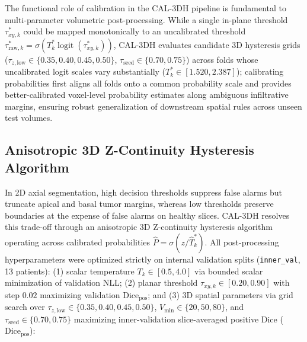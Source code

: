 \documentclass[preprint,12pt,authoryear]{elsarticle}
\begin{document}
The functional role of calibration in the CAL-3DH pipeline is fundamental to multi-parameter volumetric post-processing. While a single in-plane threshold $\tau_{xy,k}^*$ could be mapped monotonically to an uncalibrated threshold $\tau_{\text{raw},k}^* = \sigma(T_k^* \operatorname{logit}(\tau_{xy,k}^*))$, CAL-3DH evaluates candidate 3D hysteresis grids ($\tau_{z,\mathrm{low}} \in \{0.35, 0.40, 0.45, 0.50\}$, $\tau_{\mathrm{seed}} \in \{0.70, 0.75\}$) across folds whose uncalibrated logit scales vary substantially ($T_k^* \in [1.520, 2.387]$); calibrating probabilities first aligns all folds onto a common probability scale and provides better-calibrated voxel-level probability estimates along ambiguous infiltrative margins, ensuring robust generalization of downstream spatial rules across unseen test volumes.

\subsection{Anisotropic 3D Z-Continuity Hysteresis Algorithm}
In 2D axial segmentation, high decision thresholds suppress false alarms but truncate apical and basal tumor margins, whereas low thresholds preserve boundaries at the expense of false alarms on healthy slices. CAL-3DH resolves this trade-off through an anisotropic 3D Z-continuity hysteresis algorithm operating across calibrated probabilities $\hat{P} = \sigma(z / \hat{T}_k^*)$. All post-processing hyperparameters were optimized strictly on internal validation splits (\texttt{inner\_val}, 13 patients): (1) scalar temperature $T_k \in [0.5, 4.0]$ via bounded scalar minimization of validation NLL; (2) planar threshold $\tau_{xy,k} \in [0.20, 0.90]$ with step $0.02$ maximizing validation $\text{Dice}_{\text{pos}}$; and (3) 3D spatial parameters via grid search over $\tau_{z,\mathrm{low}} \in \{0.35, 0.40, 0.45, 0.50\}$, $V_{\min} \in \{20, 50, 80\}$, and $\tau_{\mathrm{seed}} \in \{0.70, 0.75\}$ maximizing inner-validation slice-averaged positive Dice ($\text{Dice}_{\text{pos}}$):
\end{document}
